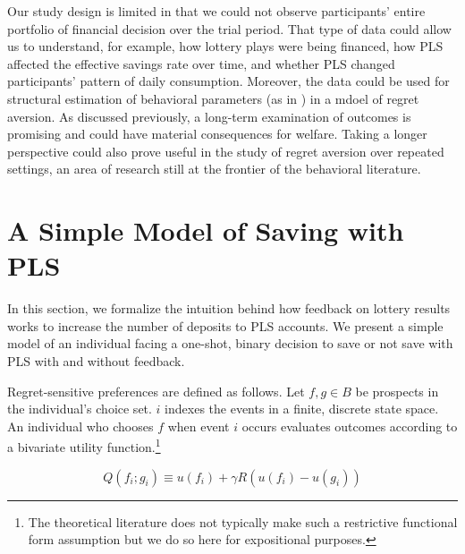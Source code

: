 \documentclass[12pt, titlepage]{article}
\begin{document}
	Our study design is limited in that we could not observe participants' entire portfolio of financial decision over the trial period. That type of data could allow us to understand, for example, how lottery plays were being financed, how PLS affected the effective savings rate over time, and whether PLS changed participants' pattern of daily consumption. Moreover, the data could be used for structural estimation of behavioral parameters (as in \textcite{filiz-ozbay_lottery_2015}) in a mdoel of regret aversion. As discussed previously, a long-term examination of outcomes is promising and could have material consequences for welfare. Taking a longer perspective could also prove useful in the study of regret aversion over repeated settings, an area of research still at the frontier of the behavioral literature.

	\clearpage

\newpage

\printbibliography

\newpage

\appendix

\section{A Simple Model of Saving with PLS} \label{sec:model}

	In this section, we formalize the intuition behind how feedback on lottery results works to increase the number of deposits to PLS accounts. We present a simple model of an individual facing a one-shot, binary decision to save or not save with PLS with and without feedback.



	Regret-sensitive preferences are defined as follows. Let $f, g \in B$ be prospects in the individual's choice set. $i$ indexes the events in a finite, discrete state space. An individual who chooses $f$ when event $i$ occurs evaluates outcomes according to a bivariate utility function.\footnote{The theoretical literature does not typically make such a restrictive functional form assumption but we do so here for expositional purposes.}

		\[ Q(f_i; g_i) \equiv u(f_i) + \gamma R(u(f_i) - u(g_i)) \]
\end{document}
